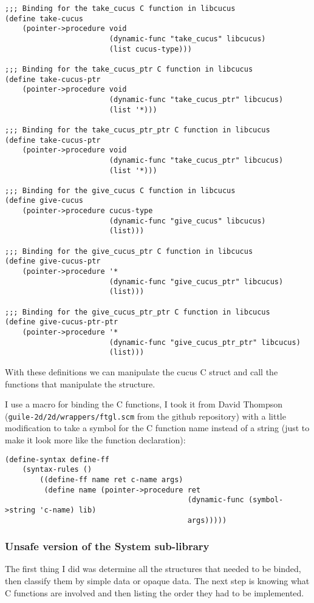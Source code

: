 \documentclass[latterpaper, leqno]{article}
\begin{document}
\begin{verbatim}
;;; Binding for the take_cucus C function in libcucus
(define take-cucus
    (pointer->procedure void
                        (dynamic-func "take_cucus" libcucus)
                        (list cucus-type)))

;;; Binding for the take_cucus_ptr C function in libcucus
(define take-cucus-ptr
    (pointer->procedure void
                        (dynamic-func "take_cucus_ptr" libcucus)
                        (list '*)))

;;; Binding for the take_cucus_ptr_ptr C function in libcucus
(define take-cucus-ptr
    (pointer->procedure void
                        (dynamic-func "take_cucus_ptr" libcucus)
                        (list '*)))

;;; Binding for the give_cucus C function in libcucus
(define give-cucus
    (pointer->procedure cucus-type
                        (dynamic-func "give_cucus" libcucus)
                        (list)))

;;; Binding for the give_cucus_ptr C function in libcucus
(define give-cucus-ptr
    (pointer->procedure '*
                        (dynamic-func "give_cucus_ptr" libcucus)
                        (list)))

;;; Binding for the give_cucus_ptr_ptr C function in libcucus
(define give-cucus-ptr-ptr
    (pointer->procedure '*
                        (dynamic-func "give_cucus_ptr_ptr" libcucus)
                        (list)))
\end{verbatim}

With these definitions we can manipulate the cucus C struct and call the functions that manipulate the structure.

I use a macro for binding the C functions, I took it from David Thompson (\texttt{guile-2d/2d/wrappers/ftgl.scm} from the github repository) with a little modification to take a symbol for the C function name instead of a string (just to make it look more like the function declaration):

\begin{verbatim}
(define-syntax define-ff
    (syntax-rules ()
        ((define-ff name ret c-name args)
         (define name (pointer->procedure ret
                                          (dynamic-func (symbol->string 'c-name) lib)
                                          args)))))
\end{verbatim}

\subsubsection*{Unsafe version of the System sub-library}
The first thing I did was determine all the structures that needed to be binded, then classify them by simple data or opaque data. The next step is knowing what C functions are involved and then listing the order they had to be implemented.
\end{document}
